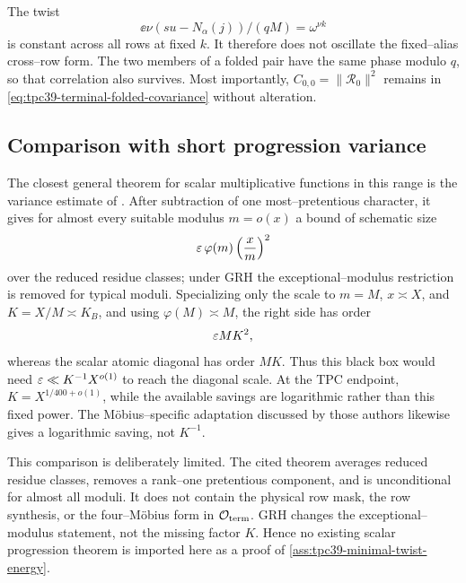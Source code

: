 The twist
\begin{equation}
 \ee{\nu(su-N_\alpha(j))/(qM)}
 =\omega^{\nu k}
 \label{eq:tpc39-terminal-physical-twist}
\end{equation}
is constant across all rows at fixed \(k\).  It therefore does not
oscillate the fixed--alias cross--row form.  The two members of a folded
pair have the same phase modulo \(q\), so that correlation also survives.
Most importantly, \(C_{0,0}=\|\mathscr R_0\|^2\) remains in
\eqref{eq:tpc39-terminal-folded-covariance} without alteration.

\subsection{Comparison with short progression variance}

The closest general theorem for scalar multiplicative functions in this
range is the variance estimate of
\citet[Theorem~1.5]{KlurmanMangerelTeravainen2023}.  After subtraction of
one most--pretentious character, it gives for almost every suitable
modulus \(m=o(x)\) a bound of schematic size
\begin{equation}
 \varepsilon\,\varphi(m)\left(\frac xm\right)^2
 \label{eq:tpc39-KMT-scale}
\end{equation}
over the reduced residue classes; under GRH the exceptional--modulus
restriction is removed for typical moduli.  Specializing only the scale to
\(m=M\), \(x\asymp X\), and \(K=X/M\asymp K_B\), and using
\(\varphi(M)\asymp M\), the right side has order
\begin{equation}
 \varepsilon MK^2,
 \label{eq:tpc39-KMT-endpoint-scale}
\end{equation}
whereas the scalar atomic diagonal has order \(MK\).  Thus this black box
would need \(\varepsilon\ll K^{-1}X^{o(1)}\) to reach the diagonal scale.  At the
TPC endpoint, \(K=X^{1/400+o(1)}\), while the available savings are
logarithmic rather than this fixed power.  The M\"obius--specific
adaptation discussed by those authors likewise gives a logarithmic
saving, not \(K^{-1}\).

This comparison is deliberately limited.  The cited theorem averages
reduced residue classes, removes a rank--one pretentious component, and is
unconditional for almost all moduli.  It does not contain the physical
row mask, the row synthesis, or the four--M\"obius form in
\(\mathcal O_{\rm term}\).  GRH changes the exceptional--modulus statement, not
the missing factor \(K\).  Hence no existing scalar progression theorem
is imported here as a proof of
\cref{ass:tpc39-minimal-twist-energy}.
